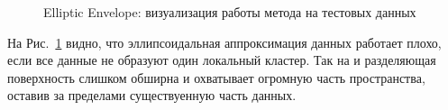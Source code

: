 \documentclass[12pt]{article}
\begin{document}
    \begin{figure}[h!]
        \centering
        \caption{Elliptic Envelope: визуализация работы метода на тестовых данных}
        \label{sec:Research:Model:Visualization:fig:EllipticEnvelope}
    \end{figure}

    \par На Рис.~\ref{sec:Research:Model:Visualization:fig:EllipticEnvelope} видно, что эллипсоидальная аппроксимация данных работает плохо, если все данные не образуют один локальный кластер. Так на  и  разделяющая поверхность слишком обширна и охватывает огромную часть пространства, оставив за пределами существуенную часть данных.
\end{document}
